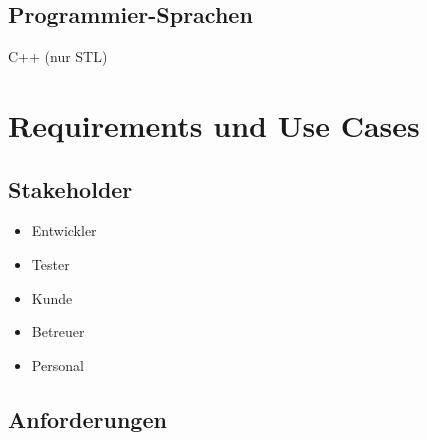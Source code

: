 \documentclass[oneside,a4paper,titlepage]{scrartcl} %
\begin{document}
\subsection{Programmier-Sprachen}
C++ (nur STL)

\section{Requirements und Use Cases}

\subsection{Stakeholder}
\begin{itemize}
    \item Entwickler
    \item Tester
    \item Kunde
    \item Betreuer
    \item Personal
\end{itemize}

\newpage

\subsection{Anforderungen}

\end{document}
